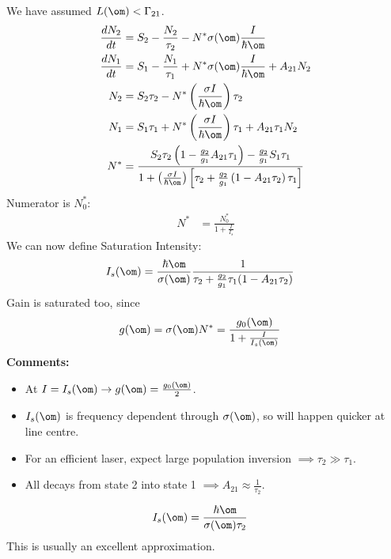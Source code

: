 \documentclass[a4paper, 11pt, normalem]{report}
\begin{document}
We have assumed $L(\om) < \Gamma_{21}$.
\begin{align}
    \frac{dN_2}{dt} &= S_2 - \frac{N_2}{\tau_2} - N^*\sigma(\om)\frac{I}{\hbar\om} \\
    \frac{dN_1}{dt} &= S_1 - \frac{N_1}{\tau_1} + N^*\sigma(\om)\frac{I}{\hbar\om} + A_{21}N_2 \\
    N_2 &= S_2\tau_2 - N^*\left(\frac{\sigma I}{\hbar\om}\right)\tau_2 \\
    N_1 &= S_1\tau_1 + N^*\left(\frac{\sigma I}{\hbar\om}\right)\tau_1 + A_{21}\tau_1N_2 \\
    N^* &= \frac{S_2\tau_2\left(1-\frac{g_2}{g_1}A_{21}\tau_1\right) - \frac{g_2}{g_1}S_1\tau_1}{1+\left(\frac{\sigma I}{\hbar\om}\right)\left[\tau_2+\frac{g_2}{g_1}\left(1-A_{21}\tau_2\right)\tau_1\right]}
\end{align}
Numerator is $N_0^*$:
\begin{align}
    N^* &= \frac{N_0^*}{1 + \frac{I}{I_s}}
\end{align}
We can now define Saturation Intensity:
\begin{align}
    I_s(\om) &= \frac{\hbar\om}{\sigma(\om)}\frac{1}{\tau_2+\frac{g_2}{g_1}\tau_1(1-A_{21}\tau_2)}
\end{align}
Gain is saturated too, since
\begin{align}
    g(\om) &= \sigma(\om)N^* = \frac{g_0(\om)}{1 + \frac{I}{I_s(\om)}}
\end{align}
\textbf{Comments:}
\begin{itemize}
    \item At $I = I_s(\om) \to g(\om) = \frac{g_0(\om)}{2}$.
    \item $I_s(\om)$ is frequency dependent through $\sigma(\om)$, so will happen quicker at line centre.
    \item For an efficient laser, expect large population inversion $\implies \tau_2 \gg \tau_1$.
    \item All decays from state 2 into state 1 $\implies A_{21} \approx \frac{1}{\tau_2}$.
\end{itemize}
\begin{align}
    I_s(\om) &= \frac{\hbar\om}{\sigma(\om)\tau_2}
\end{align}
This is usually an excellent approximation.
\end{document}
